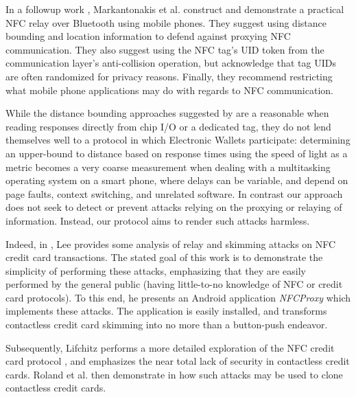 In a followup work \cite{markantonakis2012practical}, Markantonakis et al. construct and demonstrate a practical NFC relay over Bluetooth using mobile phones.
They suggest using distance bounding and location information to defend against proxying NFC communication.
They also suggest using the NFC tag's UID token from the communication layer's anti-collision operation,
    but acknowledge that tag UIDs are often randomized for privacy reasons.
Finally, they recommend restricting what mobile phone applications may do with regards to NFC communication.

While the distance bounding approaches suggested by \cite{francis2010practical, markantonakis2012practical, Drimer:2007:KYE:1362903.1362910}
    are a reasonable when reading responses directly from chip I/O or a dedicated tag,
    they do not lend themselves well to a protocol in which Electronic Wallets participate:
determining an upper-bound to distance based on response times using the speed of light as a metric becomes a very coarse measurement
    when dealing with a multitasking operating system on a smart phone, where delays can be variable, and depend on page faults, context switching, and unrelated software.
In contrast our approach does not seek to detect or prevent attacks relying on the proxying or relaying of information.
Instead, our protocol aims to render such attacks harmless.



Indeed, in \cite{lee2012nfc}, Lee provides some analysis of relay and skimming attacks on NFC credit card transactions.
The stated goal of this work is to demonstrate the simplicity of performing these attacks,
    emphasizing that they are easily performed by the general public (having little-to-no knowledge of NFC or credit card protocols).
To this end, he presents an Android application \emph{NFCProxy} \cite{NFCProxy} which implements these attacks.
The application is easily installed, and transforms contactless credit card skimming into no more than a button-push endeavor.

Subsequently, Lifchitz performs a more detailed exploration of the NFC credit card protocol \cite{lifchitz2012hacking},
    and emphasizes the near total lack of security in contactless credit cards.
Roland et al. then demonstrate in \cite{roland2013cloning} how such attacks may be used to clone contactless credit cards.


